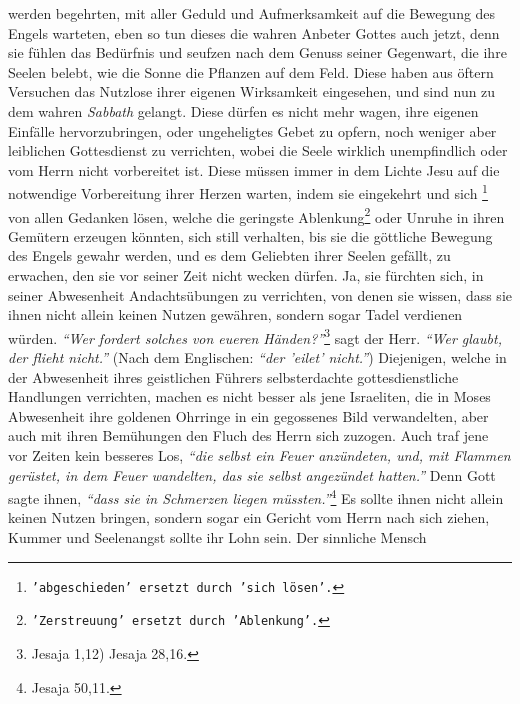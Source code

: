 werden begehrten, mit aller Geduld und Aufmerksamkeit auf
die Bewegung des
Engels warteten, eben so tun dieses die wahren Anbeter Gottes auch jetzt, denn
sie fühlen das Bedürfnis und seufzen nach dem Genuss seiner Gegenwart, die
ihre Seelen belebt, wie die Sonne die Pflanzen auf dem Feld. Diese haben aus
öftern Versuchen das Nutzlose ihrer eigenen Wirksamkeit eingesehen, und sind nun
zu dem wahren \textit{Sabbath} gelangt. Diese dürfen es nicht
mehr wagen, ihre
eigenen Einfälle hervorzubringen, oder ungeheligtes Gebet zu opfern, noch
weniger aber leiblichen Gottesdienst zu verrichten, wobei die Seele wirklich
unempfindlich oder vom Herrn nicht vorbereitet ist. Diese müssen immer in dem
Lichte Jesu auf die notwendige Vorbereitung ihrer Herzen
warten, indem sie
eingekehrt und sich \footnote{\texttt{'abgeschieden' ersetzt durch 'sich
lösen'.}} von allen Gedanken lösen, welche die geringste
Ablenkung\footnote{\texttt{'Zerstreuung' ersetzt durch 'Ablenkung'.}}
oder Unruhe in ihren Gemütern erzeugen könnten, sich still verhalten, bis sie
die göttliche Bewegung des Engels gewahr werden, und es dem Geliebten ihrer
Seelen gefällt, zu erwachen, den sie vor seiner Zeit nicht wecken dürfen. Ja,
sie fürchten sich, in seiner Abwesenheit Andachtsübungen zu verrichten, von
denen sie wissen, dass sie ihnen nicht allein keinen Nutzen gewähren, sondern
sogar Tadel verdienen würden.
\textit{"`Wer fordert solches von eueren Händen?"'}\footnote{Jesaja 1,12) Jesaja
28,16.}
sagt der Herr.
\textit{"`Wer glaubt, der flieht nicht."'} (Nach dem Englischen: \textit{"`der
'eilet' nicht."'}) Diejenigen,
welche in der Abwesenheit ihres geistlichen Führers selbsterdachte
gottesdienstliche Handlungen verrichten, machen es nicht besser als jene
Israeliten, die in Moses
Abwesenheit ihre goldenen Ohrringe in ein
gegossenes Bild verwandelten, aber auch mit ihren
Bemühungen den Fluch des Herrn sich zuzogen. Auch traf jene vor
Zeiten kein besseres Los,
\textit{"`die selbst ein Feuer anzündeten, und, mit Flammen gerüstet, in dem
Feuer wandelten, das sie
selbst angezündet hatten."'} Denn Gott sagte ihnen,
\textit{"`dass sie in Schmerzen liegen müssten."'}\footnote{Jesaja 50,11.}
Es sollte ihnen nicht allein keinen
Nutzen bringen, sondern sogar ein Gericht vom Herrn nach sich ziehen, Kummer und
Seelenangst sollte ihr Lohn sein. Der sinnliche Mensch
